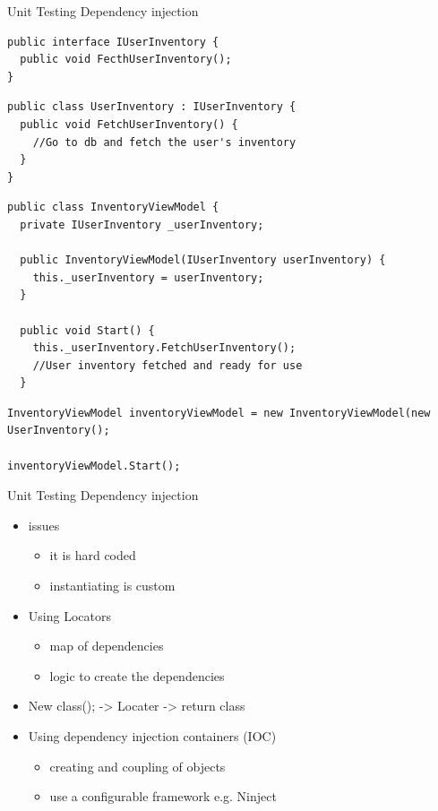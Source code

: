 \begin{frame} [fragile] {Unit Testing} {Dependency injection}

\begin{lstlisting}
public interface IUserInventory {
  public void FecthUserInventory();
}
\end{lstlisting}

\begin{lstlisting}
public class UserInventory : IUserInventory {
  public void FetchUserInventory() {
    //Go to db and fetch the user's inventory
  }
}
\end{lstlisting}

\begin{lstlisting}
public class InventoryViewModel {
  private IUserInventory _userInventory;
  
  public InventoryViewModel(IUserInventory userInventory) {
    this._userInventory = userInventory;
  }
  
  public void Start() {
    this._userInventory.FetchUserInventory();
    //User inventory fetched and ready for use
  }
\end{lstlisting}

\begin{lstlisting}
InventoryViewModel inventoryViewModel = new InventoryViewModel(new UserInventory();

inventoryViewModel.Start();
\end{lstlisting}

\end{frame}

\begin{frame} {Unit Testing} {Dependency injection}

\begin{itemize}
	\item issues
		\begin{itemize}
			\item it is hard coded
			\item instantiating is custom
		\end{itemize}
\end{itemize}

\begin{itemize}
	\item Using Locators
		\begin{itemize}
			\item map of dependencies
			\item logic to create the dependencies
		\end{itemize}
	\item New class(); -> Locater -> return class
	\item Using dependency injection containers (IOC)
		\begin{itemize}
			\item creating and coupling of objects
			\item use a configurable framework e.g. Ninject
		\end{itemize}		 
\end{itemize}

\end{frame}